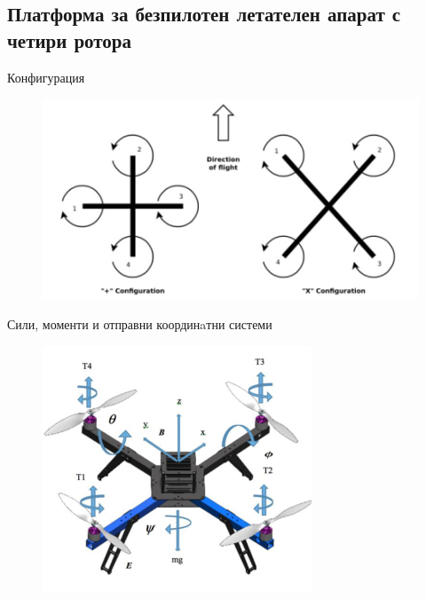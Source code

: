 \documentclass{beamer}
\begin{document}
\subsection{Платформа за безпилотен летателен апарат с четири ротора}


\begin{frame}{Конфигурация}
	\pause
	\begin{figure}[!h]
		\centering
		\includegraphics[width=0.9\columnwidth]{Images/rotors.png}
	\end{figure}
\end{frame}

\begin{frame}{Сили, моменти и отправни координaтни системи}
	\pause
\begin{figure}[!h]
    \centering
    \includegraphics[width=0.6\columnwidth]{Images/kinematika.png}

\end{figure}
\end{frame}
\end{document}

